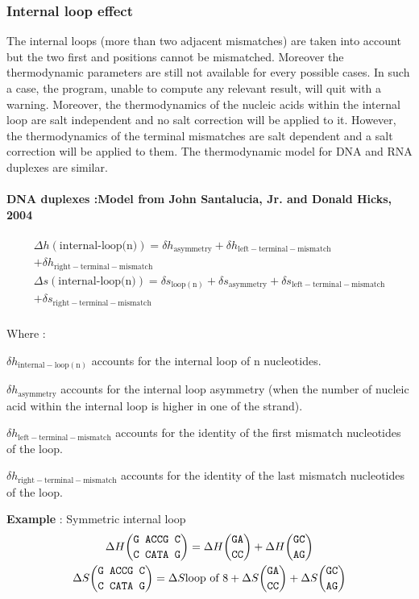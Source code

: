 \documentclass{article}
\begin{document}
\clearpage
\subsubsection{Internal loop effect}

The internal loops (more than two adjacent mismatches) are taken into account but the two first and positions cannot
be mismatched. Moreover the thermodynamic parameters are still not available for every possible cases.
In such a case, the program, unable to compute any relevant result, will quit with a warning.
Moreover, the thermodynamics of the nucleic acids within the internal loop are salt 
independent and no salt correction will be applied to it. However, the thermodynamics
of the terminal mismatches are salt dependent and a salt correction will be applied
to them.
The thermodynamic model for DNA and RNA duplexes are similar.

\paragraph{DNA duplexes :\textbf{Model from John Santalucia, Jr. and Donald Hicks, 2004}} 

\begin{multline*}
\Delta h {(\mbox{internal-loop(n)})} =
\delta{}h_\mathrm{asymmetry} +
\delta{}h_\mathrm{left-terminal-mismatch} \\ +
\delta{}h_\mathrm{right-terminal-mismatch}\\
\Delta s {(\mbox{internal-loop(n)})} =
\delta{}s_\mathrm{loop(n)} +
\delta{}s_\mathrm{asymmetry} +
\delta{}s_\mathrm{left-terminal-mismatch} \\ +
\delta{}s_\mathrm{right-terminal-mismatch}\\
\end{multline*}

Where :

$\delta{}h_\mathrm{internal-loop(n)}$ accounts for the internal loop of n nucleotides.

$\delta{}h_\mathrm{asymmetry}$ accounts for the internal loop asymmetry (when the number of
nucleic acid within the internal loop is higher in one of the strand).

$\delta{}h_\mathrm{left-terminal-mismatch}$ accounts for the identity of the first mismatch 
nucleotides of the loop.

$\delta{}h_\mathrm{right-terminal-mismatch}$ accounts for the identity of the last mismatch 
nucleotides of the loop.

\textbf{Example} : Symmetric internal loop
\begin{multline*}
\Delta H {\mbox{\texttt{G ACCG C}} \choose \mbox{\texttt{C CATA G}}} = 
\Delta H {\mbox{\texttt{GA}} \choose \mbox{\texttt{CC}}} +
\Delta H {\mbox{\texttt{GC}} \choose \mbox{\texttt{AG}}}\\
\Delta S {\mbox{\texttt{G ACCG C}} \choose \mbox{\texttt{C CATA G}}} = 
\Delta S {\mbox{loop of 8}} +
\Delta S {\mbox{\texttt{GA}} \choose \mbox{\texttt{CC}}} +
\Delta S {\mbox{\texttt{GC}} \choose \mbox{\texttt{AG}}}\\
\end{multline*}
\end{document}
